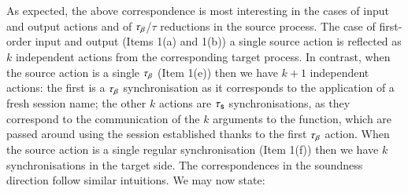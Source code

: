\documentclass[preprint,11pt]{elsarticle}
\begin{document}
{%
%

As expected, the above correspondence is most interesting in the cases of input and output actions and 
of $\tau_{\beta}$/$\tau$ reductions in the source process. The case of first-order input and output (Items 1(a) and 1(b))
a single source action is reflected as $k$ independent actions from the corresponding target process.
In contrast, when the source action is a single $\tau_{\beta}$ (Item 1(e)) then we have $k+1$ independent actions:
the first is a $\tau_{\beta}$ synchronisation as it corresponds to the application of a fresh session name; the other $k$ actions 
are $\tau_{\mathsf{s}}$ synchronisations, as they
correspond to the communication of the 
$k$ arguments to the function, which are passed around using the session established thanks to the first $\tau_{\beta}$ action.
When the source action is a single regular synchronisation (Item 1(f)) then we have $k$ synchronisations in the target side.
The correspondences in the soundness direction follow similar intuitions.
We may now state:


}
\end{document}
